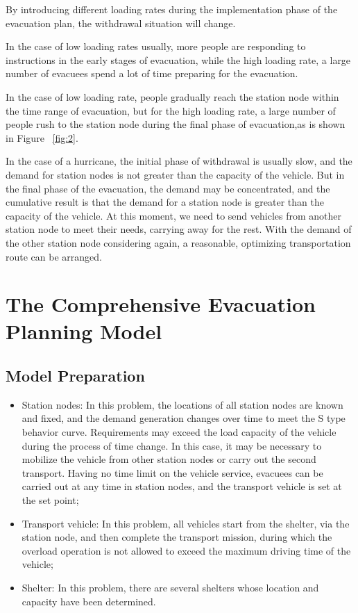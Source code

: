 \documentclass{mcmthesis}
\begin{document}
By introducing different loading rates during the implementation phase of the evacuation plan, the withdrawal situation will change.

In the case of low loading rates usually, more people are responding to instructions in the early stages of evacuation, while the high loading rate, a large number of evacuees spend a lot of time preparing for the evacuation.

In the case of low loading rate, people gradually reach the station node within the time range of evacuation, but for the high loading rate, a large number of people rush to the station node during the final phase of evacuation,as is shown in Figure ~\ref{fig:2}.



In the case of a hurricane, the initial phase of withdrawal is usually slow, and the demand for station nodes is not greater than the capacity of the vehicle. But in the final phase of the evacuation, the demand may be concentrated, and the cumulative result is that the demand for a station node is greater than the capacity of the vehicle. At this moment, we need  to send vehicles from another station node to meet their needs, carrying away for the rest. With the demand of the other station node considering again, a reasonable, optimizing transportation route can be arranged.

\section{The Comprehensive Evacuation Planning Model}
\subsection{Model Preparation}

\begin{itemize}

\item Station nodes: In this problem, the locations of all station nodes are known and fixed, and the demand generation changes over time to meet the S type behavior curve. Requirements may exceed the load capacity of the vehicle during the process of time change. In this case, it may be necessary to mobilize the vehicle from other station nodes or carry out the second transport. Having no time limit on the vehicle service, evacuees can be carried out at any time in station nodes, and the transport vehicle is set at the set point;
\item Transport vehicle: In this problem, all vehicles start from the shelter, via the station node, and then complete the transport mission, during which the overload operation is not allowed to exceed the maximum driving time of the vehicle;

\item Shelter: In this problem, there are several shelters whose location and capacity have been determined.
\end{itemize}
\end{document}
